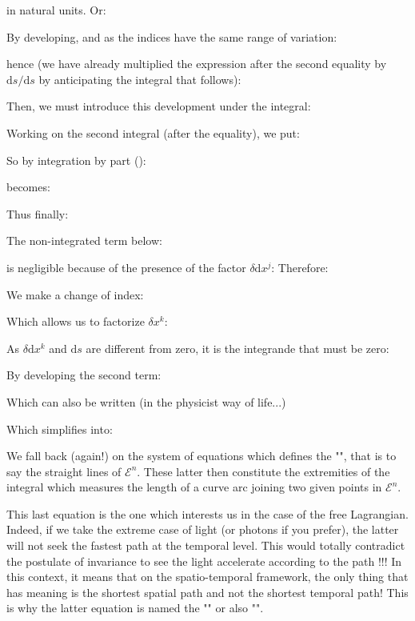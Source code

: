 	in natural units. Or:
	
	By developing, and as the indices have the same range of variation:
	
	hence (we have already multiplied the expression after the second equality by $\mathrm{d}s/\mathrm{d}s$ by anticipating the integral that follows):
	
	Then, we must introduce this development under the integral:
	
	Working on the second integral (after the equality), we put:
	
	So by integration by part ():
	
	becomes:
	
	Thus finally:
	
	The non-integrated term below:
	
	is negligible because of the presence of the factor $\delta \mathrm{d}x^j$:
	Therefore:
	
	We make a change of index:
	
	Which allows us to factorize $\delta x^k$:
	
	As $\delta \mathrm{d}x^k$ and $\mathrm{d}s$ are different from zero, it is the integrande that must be zero:
	
	By developing the second term:
	
	Which can also be written (in the physicist way of life...)
	
	Which simplifies into:
	
	We fall back (again!) on the system of equations which defines the "", that is to say the straight lines of $\mathcal{E}^n$. These latter then constitute the extremities of the integral which measures the length of a curve arc joining two given points in $\mathcal{E}^n$.

	This last equation is the one which interests us in the case of the free Lagrangian. Indeed, if we take the extreme case of light (or photons if you prefer), the latter will not seek the fastest path at the temporal level. This would totally contradict the postulate of invariance to see the light accelerate according to the path !!! In this context, it means that on the spatio-temporal framework, the only thing that has meaning is the shortest spatial path and not the shortest temporal path! This is why the latter equation is named the "" or also "".

